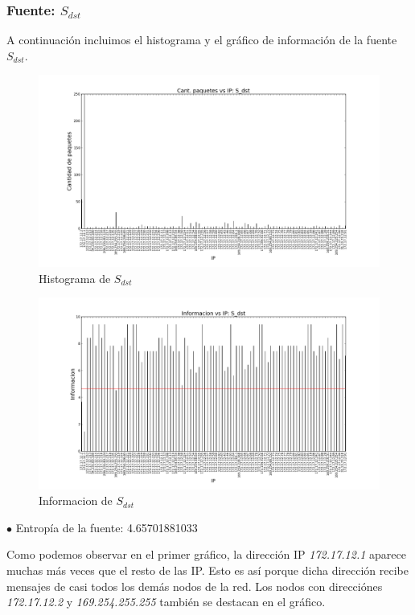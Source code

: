 \subsubsection{Fuente: $S_{dst}$}

A continuación incluimos el histograma y el gráfico de información de la fuente $S_{dst}$. 

\begin{figure}[H]\centering
  \includegraphics[width=0.8\linewidth]{../imgs/red-alto-palermo_S_dst_hist.png}
  \caption{Histograma de $S_{dst}$}\label{fig:Alto-dst-hist}
\end{figure}

\begin{figure}[H]\centering
  \includegraphics[width=0.8\linewidth]{../imgs/red-alto-palermo_S_dst_info.png}
  \caption{Informacion de $S_{dst}$}\label{fig:Alto-dst-info}
\end{figure}

$\bullet$ Entropía de la fuente: 4.65701881033

Como podemos observar en el primer gráfico, la dirección IP \emph{172.17.12.1} aparece muchas más veces que el resto de las IP. Esto es así porque dicha dirección recibe mensajes de casi todos los demás nodos de la red. Los nodos con direcciónes \emph{172.17.12.2} y \emph{169.254.255.255} también se destacan en el gráfico.

